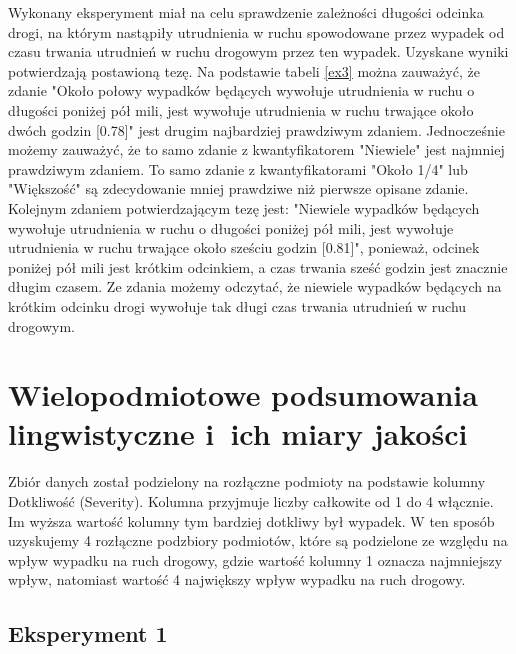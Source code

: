 \documentclass{classrep}
\begin{document}
Wykonany eksperyment miał na celu sprawdzenie zależności długości odcinka drogi, na którym nastąpiły utrudnienia w ruchu spowodowane przez wypadek od czasu trwania utrudnień w ruchu drogowym przez ten wypadek. Uzyskane wyniki potwierdzają postawioną tezę. Na podstawie tabeli \ref{ex3} można zauważyć, że zdanie "Około połowy wypadków będących wywołuje utrudnienia w ruchu o długości poniżej pół mili, jest wywołuje utrudnienia w ruchu trwające około dwóch godzin [0.78]" jest drugim najbardziej prawdziwym zdaniem. Jednocześnie możemy zauważyć, że to samo zdanie z kwantyfikatorem "Niewiele" jest najmniej prawdziwym zdaniem. To samo zdanie z kwantyfikatorami "Około 1/4" lub "Większość" są zdecydowanie mniej prawdziwe niż pierwsze opisane zdanie. Kolejnym zdaniem potwierdzającym tezę jest: "Niewiele wypadków będących wywołuje utrudnienia w ruchu o długości poniżej pół mili, jest wywołuje utrudnienia w ruchu trwające około sześciu godzin [0.81]", ponieważ, odcinek poniżej pół mili jest krótkim odcinkiem, a czas trwania sześć godzin jest znacznie długim czasem. Ze zdania możemy odczytać, że niewiele wypadków będących na krótkim odcinku drogi wywołuje tak długi czas trwania utrudnień w ruchu drogowym.


\section{Wielopodmiotowe podsumowania lingwistyczne i~ich miary jakości}
\label{section:ex_wiel}

Zbiór danych został podzielony na rozłączne podmioty na podstawie kolumny Dotkliwość (Severity). Kolumna przyjmuje liczby całkowite od 1 do 4 włącznie. Im wyższa wartość kolumny tym bardziej dotkliwy był wypadek. W ten sposób uzyskujemy 4 rozłączne podzbiory podmiotów, które są podzielone ze względu na wpływ wypadku na ruch drogowy, gdzie wartość kolumny 1 oznacza najmniejszy wpływ, natomiast wartość 4 największy wpływ wypadku na ruch drogowy.


\subsection{Eksperyment 1}
\label{section:ex_wiel1}
\end{document}
